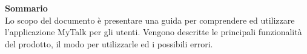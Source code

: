 \Large{\textbf{Sommario}}\\
{
\normalsize
Lo scopo del documento è presentare una guida per comprendere ed utilizzare  l’applicazione MyTalk per gli utenti. Vengono descritte le principali funzionalità del prodotto, il modo per utilizzarle ed i possibili errori.
}
